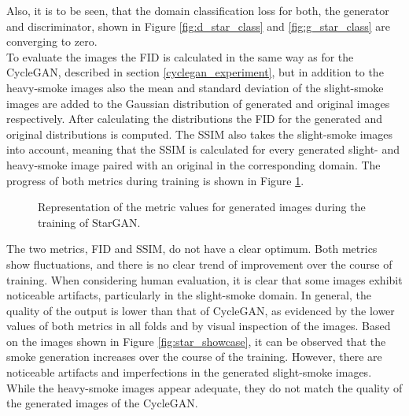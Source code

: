 Also, it is to be seen, that the domain classification loss for both, the generator and discriminator, shown in Figure \ref{fig:d_star_class} and \ref{fig:g_star_class} are converging to zero.\\
To evaluate the images the FID is calculated in the same way as for the CycleGAN, described in section \ref{cyclegan_experiment}, but in addition to the heavy-smoke images also the mean and standard deviation of the slight-smoke images are added to the Gaussian distribution of generated and original images respectively.
After calculating the distributions the FID for the generated and original distributions is computed.
The SSIM also takes the slight-smoke images into account, meaning that the SSIM is calculated for every generated slight- and heavy-smoke image paired with an original in the corresponding domain.
The progress of both metrics during training is shown in Figure \ref{fig:star_metric_plots}.
\begin{figure}[tb]
    \centering
    \hfill
    \caption{Representation of the metric values for generated images during the training of StarGAN.}\label{fig:star_metric_plots}
\end{figure}
The two metrics, FID and SSIM, do not have a clear optimum.
Both metrics show fluctuations, and there is no clear trend of improvement over the course of training. 
When considering human evaluation, it is clear that some images exhibit noticeable artifacts, particularly in the slight-smoke domain.
In general, the quality of the output is lower than that of CycleGAN, as evidenced by the lower values of both metrics in all folds and by visual inspection of the images.
Based on the images shown in Figure \ref{fig:star_showcase}, it can be observed that the smoke generation increases over the course of the training.
However, there are noticeable artifacts and imperfections in the generated slight-smoke images.
While the heavy-smoke images appear adequate, they do not match the quality of the generated images of the CycleGAN.
